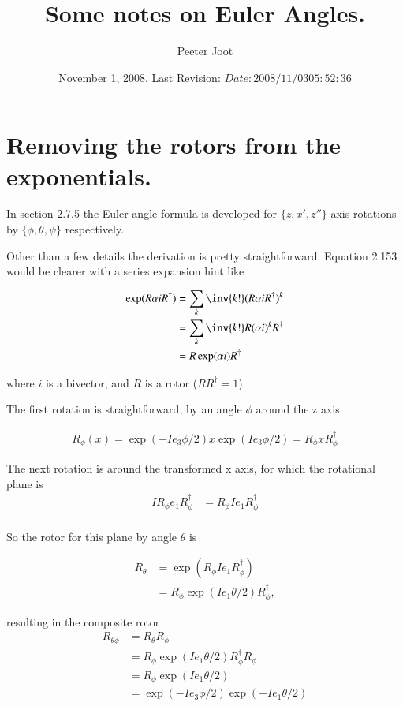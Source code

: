 \documentclass{article}
\title{Some notes on Euler Angles.}
\author{Peeter Joot}
\date{ November 1, 2008. Last Revision: $Date: 2008/11/03 05:52:36 $ }
\begin{document}
\maketitle{}
\tableofcontents

\section{ Removing the rotors from the exponentials. }

In \cite{doran2003gap} section 2.7.5 the Euler angle formula is 
developed for $\{z,x',z''\}$ axis rotations by $\{\phi, \theta, \psi\}$
respectively.

Other than a few details the derivation is pretty straightforward.  Equation
2.153 would be clearer with a series expansion hint like

\begin{align*}
\exp(R \alpha i R^\dagger) 
&= \sum_k \inv{k!} (R \alpha i R^\dagger)^k \\
&= \sum_k \inv{k!} R (\alpha i)^k R^\dagger \\
&= R \exp(\alpha i) R^\dagger
\end{align*}

where $i$ is a bivector, and $R$ is a rotor ($RR^\dagger = 1$).

The first rotation is straightforward, by an angle $\phi$ around the z axis

\begin{align*}
R_\phi(x) = \exp(-Ie_3 \phi/2) x \exp(Ie_3 \phi/2) = R_\phi x R_\phi^\dagger
\end{align*}

The next rotation is around the transformed x axis, for which the rotational plane is
\begin{align*}
I R_\phi e_1 R_\phi^\dagger 
&= R_\phi I e_1 R_\phi^\dagger  \\
\end{align*}

So the rotor for this plane by angle $\theta$ is

\begin{align*}
R_\theta 
&= \exp( R_\phi I e_1 R_\phi^\dagger ) \\
&= R_\phi \exp( I e_1 \theta/2) R_\phi^\dagger,
\end{align*}

resulting in the composite rotor
\begin{align*}
R_{\theta\phi}
&=
R_\theta 
R_\phi \\
&= R_\phi \exp( I e_1 \theta/2) R_\phi^\dagger R_\phi \\
&= R_\phi \exp( I e_1 \theta/2) \\
&= 
\exp{( -I e_3 \phi/2 )}
\exp( -I e_1 \theta/2 ) \\
\end{align*}
\end{document}
